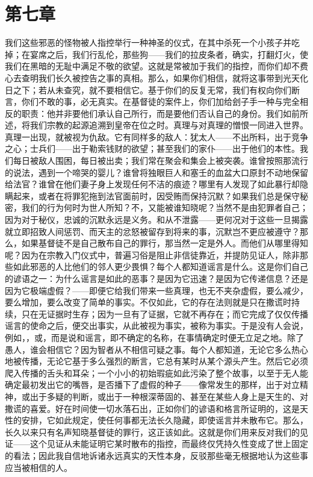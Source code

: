 \section{第七章}

我们这些邪恶的怪物被人指控举行一种神圣的仪式，在其中杀死一个小孩子并吃掉；在宴席之后，我们行乱伦，那些狗——我们的拉皮条者，确实，打翻灯火，使我们在黑暗的无耻中满足不敬的欲望。这就是常被加于我们的指控，而你们却不费心去查明我们长久被控告之事的真相。那么，如果你们相信，就将这事带到光天化日之下；若从未查究，就不要相信它。基于你们的反复无常，我们有权向你们断言，你们不敢的事，必无真实。在基督徒的案件上，你们加给刽子手一种与完全相反的职责：他并非要他们承认自己所行，而是要他们否认自己的身份。我们如前所述，将我们宗教的起源追溯到皇帝在位之时。真理与对真理的憎恨一同进入世界。真理一出现，就被视为仇敌。它有同样多的敌人：犹太人——不出所料，出于竞争之心；士兵们——出于勒索钱财的欲望；甚至我们的家仆——出于他们的本性。我们每日被敌人围困，每日被出卖；我们常在聚会和集会上被突袭。谁曾按照那流行的说法，遇到一个啼哭的婴儿？谁曾将独眼巨人和塞壬的血盆大口原封不动地保留给法官？谁曾在他们妻子身上发现任何不洁的痕迹？哪里有人发现了如此暴行却隐瞒起来，或者在将罪犯拖到法官面前时，因受贿而保持沉默？如果我们总是保守秘密，我们的行为何时为世人所知？不，又能被谁知晓呢？当然不是由犯罪者自己；因为对于秘仪，忠诚的沉默永远是义务。和从不泄露——更何况对于这些一旦揭露就立即招致人间惩罚、而天主的忿怒被留存到将来的事，沉默岂不更应被遵守？那么，如果基督徒不是自己散布自己的罪行，那当然一定是外人。而他们从哪里得知呢？因为在宗教入门仪式中，普遍习俗是阻止非信徒靠近，并提防见证人，除非那些如此邪恶的人比他们的邻人更少畏惧？每个人都知道谣言是什么。这是你们自己的谚语之一：为什么谣言是如此的恶事？是因为它迅速？是因为它传递信息？还是因为它极端虚假？——即便它给我们带来一些真理，也无不夹杂虚假，要么减少，要么增加，要么改变了简单的事实。不仅如此，它的存在法则就是只在撒谎时持续，只在无证据时生存；因为一旦有了证据，它就不再存在；而它完成了仅仅传播谣言的使命之后，便交出事实，从此被视为事实，被称为事实。于是没有人会说，例如，，或，而是说和谣言，即不确定的名称，在事情确定时便无立足之地。除了愚人，谁会相信它？因为智者从不相信可疑之事。每个人都知道，无论它多么热心地被传播，无论它基于多么强烈的断言，它总有某时从某个源头产生。然后它必须爬入传播的舌头和耳朵；一个小小的初始瑕疵如此污染了整个故事，以至于无人能确定最初发出它的嘴唇，是否播下了虚假的种子——像常发生的那样，出于对立精神，或出于多疑的判断，或出于一种根深蒂固的、甚至在某些人身上是天生的、对撒谎的喜爱。好在时间使一切水落石出，正如你们的谚语和格言所证明的，这是天性的安排，它如此规定，使任何事都无法长久隐藏，即使谣言并未散布它。那么，长久以来只有名声知晓基督徒的罪行，这正该如此。这就是你们用来反对我们的见证——这个见证从未能证明它某时散布的指控，而最终仅凭持久性变成了世上固定的看法；因此我自信地诉诸永远真实的天性本身，反驳那些毫无根据地认为这些事应当被相信的人。\par

